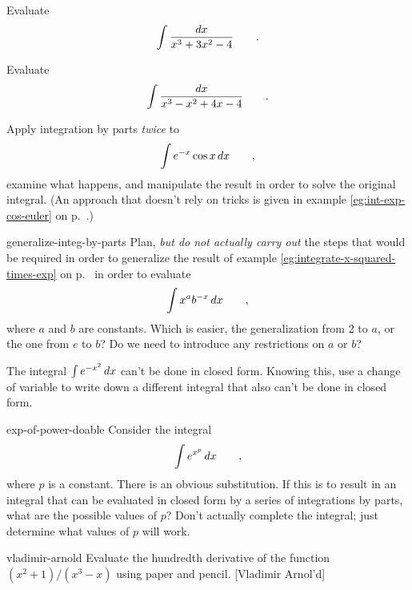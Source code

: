 \begin{hwsection}
\begin{hw}
Evaluate
\begin{equation*}
  \int \frac{\mathop{d\!} x}{x^3+3x^2-4} \qquad .
\end{equation*}
\end{hw}

\begin{hw}
Evaluate
\begin{equation*}
  \int \frac{\mathop{d\!} x}{x^3-x^2+4x-4} \qquad .
\end{equation*}
\end{hw}

\begin{hw}\label{hw:integration-by-parts-twice-trick}
Apply integration by parts \emph{twice} to
\begin{equation*}
  \int e^{-x}\cos x \mathop{d\!} x \qquad ,
\end{equation*}
examine what happens, and manipulate the result in order to solve the original integral.
(An approach that doesn't rely on tricks is given in example \ref{eg:int-exp-cos-euler} on p.~\pageref{eg:int-exp-cos-euler}.)
\end{hw}

\begin{hwwithsoln}{generalize-integ-by-parts}
Plan, \emph{but do not actually carry out} the steps that would be required in order to generalize
the result of example \ref{eg:integrate-x-squared-times-exp} on p.~\pageref{eg:integrate-x-squared-times-exp}
in order to evaluate
\begin{equation*}
  \int x^a b^{-x} \mathop{d\!} x \qquad ,
\end{equation*}
where $a$ and $b$ are constants.
Which is easier, the generalization from 2 to $a$, or the one from $e$ to $b$?
Do we need to introduce any restrictions on $a$ or $b$?
\end{hwwithsoln}

\begin{hw}
The integral $\int e^{-x^2}\mathop{d\!} x$ can't be done in closed form. Knowing this, use a change
of variable to write down a different integral that also can't be done in closed form.
\end{hw}

\begin{hwwithsoln}{exp-of-power-doable}
Consider the integral
\begin{equation*}
  \int e^{x^p} \mathop{d\!} x \qquad ,
\end{equation*}
where $p$ is a constant. There is an obvious substitution. If this is to result in
an integral that can be evaluated in closed form by a series of integrations by parts,
what are the possible values of $p$? Don't actually complete the integral; just determine
what values of $p$ will work.
\end{hwwithsoln}

\begin{hwwithsoln}[2]{vladimir-arnold}
Evaluate the hundredth derivative of the function\\ $(x^2+1)/(x^3-x)$ using paper and pencil.
[Vladimir Arnol'd]
\end{hwwithsoln}


\end{hwsection}
